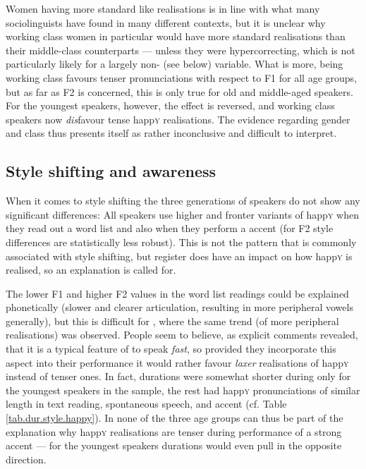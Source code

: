 Women having more standard like realisations is in line with what many sociolinguists have found in many different contexts, but it is unclear why working class women in particular would have more standard realisations than their middle-class counterparts --- unless they were hypercorrecting, which is not particularly likely for a largely non- (see below) variable.
What is more, being working class favours tenser pronunciations with respect to F1 for all age groups, but as far as F2 is concerned, this is only true for old and middle-aged speakers.
For the youngest speakers, however, the effect is reversed, and working class speakers now \emph{dis}favour tense happ\textsc{y} realisations.
The evidence regarding gender and class thus presents itself as rather inconclusive and difficult to interpret.

\subsection{Style shifting and awareness}
\label{prod.disc.happy.style}

When it comes to style shifting the three generations of speakers do not show any significant differences: All speakers use higher and fronter variants of happ\textsc{y} when they read out a word list and also when they perform a   accent (for F2 style differences are statistically less robust).
This is not the pattern that is commonly associated with  style shifting, but register does have an impact on how happ\textsc{y} is realised, so an explanation is called for.

The lower F1 and higher F2 values in the word list readings could be explained phonetically (slower and clearer articulation, resulting in more peripheral vowels generally), but this is difficult for , where the same trend (of more peripheral realisations) was observed.
People seem to believe, as explicit comments revealed, that it is a typical feature of  to speak \emph{fast}, so provided they incorporate this aspect into their  performance it would rather favour \emph{laxer} realisations of happ\textsc{y} instead of tenser ones.
In fact,  durations were somewhat shorter during  only for the youngest speakers in the sample, the rest had happ\textsc{y} pronunciations of similar length in text reading, spontaneous speech, and accent  (cf. Table \ref{tab.dur.style.happy}).
In none of the three age groups can  thus be part of the explanation why happ\textsc{y} realisations are tenser during performance of a strong  accent --- for the youngest speakers durations would even pull in the opposite direction.

